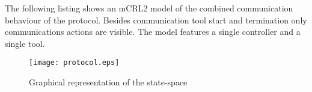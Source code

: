 \documentclass{article}
\begin{document}
  The following listing shows an mCRL2 model of the combined communication
  behaviour of the protocol. Besides communication tool start and termination
  only communications actions are visible. The model features a single
  controller and a single tool.

  \addtolength{\oddsidemargin}{-2cm}
  \addtolength{\evensidemargin}{-2cm}
  \small  \normalsize

  \pagebreak
  \addtolength{\oddsidemargin}{2cm}
  \addtolength{\evensidemargin}{2cm}

  \begin{figure}[H]
   \texttt{[image: protocol.eps]}
   \caption{Graphical representation of the state-space}
  \end{figure}


   
   
\end{document}
